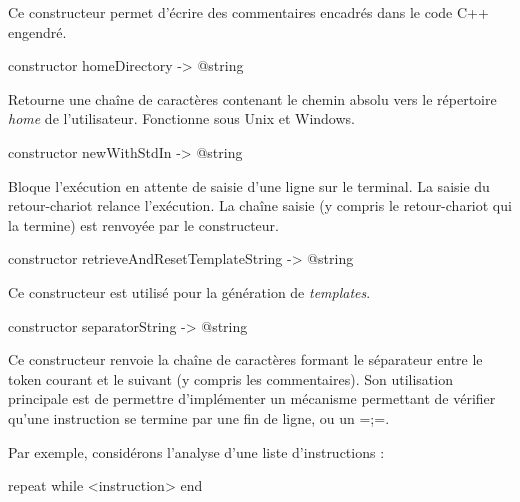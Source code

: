 Ce constructeur permet d'écrire des commentaires encadrés dans le code C++ engendré.





\begin{galgas4box}
constructor homeDirectory -> @string
\end{galgas4box}

Retourne une chaîne de caractères contenant le chemin absolu vers le répertoire \emph{home} de l'utilisateur. Fonctionne sous Unix et Windows.





\begin{galgas4box}
constructor newWithStdIn -> @string
\end{galgas4box}

Bloque l'exécution en attente de saisie d'une ligne sur le terminal. La saisie du retour-chariot relance l'exécution. La chaîne saisie (y compris le retour-chariot qui la termine) est renvoyée par le constructeur.







\begin{galgas4box}
constructor retrieveAndResetTemplateString -> @string
\end{galgas4box}

Ce constructeur est utilisé pour la génération de \emph{templates}.







\begin{galgas4box}
constructor separatorString -> @string
\end{galgas4box}

Ce constructeur renvoie la chaîne de caractères formant le séparateur entre le token courant et le suivant (y compris les commentaires). Son utilisation principale est de permettre d'implémenter un mécanisme permettant de vérifier qu'une instruction se termine par une fin de ligne, ou un \ggsq=;=.

Par exemple, considérons l'analyse d'une liste d'instructions :

\begin{galgas4}
repeat
while
  <instruction>
end
\end{galgas4}

